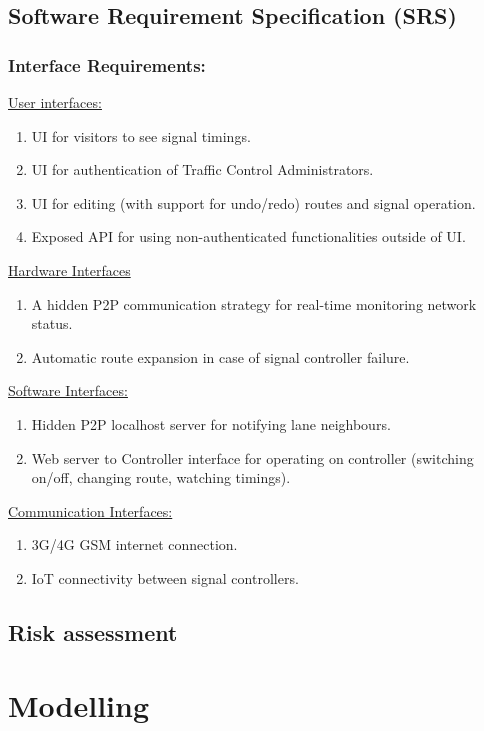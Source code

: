 \documentclass[twoside,a4paper,12pt]{book}
\begin{document}
\newpage
\section{Software Requirement Specification (SRS)}
\subsection{Interface Requirements:}
\underline{User interfaces:}
\begin{enumerate}
	\item UI for visitors to see signal timings.
	\item UI for authentication of Traffic Control Administrators.
	\item UI for editing (with support for undo/redo) routes and signal operation.
	\item Exposed API for using non-authenticated functionalities outside of UI.
\end{enumerate}

\underline{Hardware Interfaces}
\begin{enumerate}
	\item A hidden P2P communication strategy for real-time monitoring network status.
	\item Automatic route expansion in case of signal controller failure.
\end{enumerate}
\underline{Software Interfaces:}
\begin{enumerate}
	\item Hidden P2P localhost server for notifying lane neighbours.
	\item Web server to Controller interface for operating on controller (switching on/off, changing route, watching timings).
\end{enumerate}

\underline{Communication Interfaces:}
\begin{enumerate}
	\item 3G/4G GSM internet connection.
	\item IoT connectivity between signal controllers.
\end{enumerate}

\newpage


\section{Risk assessment}  


\newpage
\chapter{Modelling}
\end{document}
